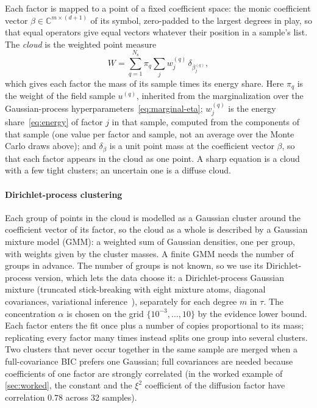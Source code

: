 \documentclass[11pt]{article}
\theoremstyle{plain}
\theoremstyle{definition}
\theoremstyle{remark}
\newcommand{\C}{\mathbb{C}}
\newcommand{\Nsamp}{N_{\mathrm s}}          %
\newcommand{\cloud}{W}                      %
\begin{document}
Each factor is mapped to a point of a fixed coefficient space: the monic coefficient vector
$\beta\in\C^{m\times(d+1)}$ of its symbol, zero-padded to the largest degrees in play, so that equal
operators give equal vectors whatever their position in a sample's list. The \emph{cloud} is the weighted
point measure
\begin{equation}\label{eq:cloud}
  \cloud=\sum_{q=1}^{\Nsamp}\pi_q\sum_jw_j^{(q)}\,\delta_{\beta_j^{(q)}},
\end{equation}
which gives each factor the mass of its sample times its energy share. Here $\pi_q$ is the weight of the field
sample $u^{(q)}$, inherited from the marginalization over the Gaussian-process hyperparameters~\eqref{eq:marginal-eta};
$w_j^{(q)}$ is the energy share~\eqref{eq:energy} of factor $j$ in that sample, computed from the components of that
sample (one value per factor and sample, not an average over the Monte Carlo draws above); and $\delta_{\beta}$ is a unit
point mass at the coefficient vector $\beta$, so that each factor appears in the cloud as one point. A sharp equation is a cloud with
a few tight clusters; an uncertain one is a diffuse cloud.

\paragraph{Dirichlet-process clustering}
Each group of points in the cloud is modelled as a Gaussian cluster around the coefficient vector of its factor, so
the cloud as a whole is described by a Gaussian mixture model (GMM): a weighted sum of Gaussian densities, one per
group, with weights given by the cluster masses. A finite GMM needs the number of groups in advance. The number of
groups is not known, so we use its Dirichlet-process version, which lets the data choose it: a Dirichlet-process Gaussian mixture
(truncated stick-breaking with eight mixture atoms, diagonal covariances, variational
inference~\cite{BleJor06}), separately for each degree $m$ in $\tau$. The concentration $\alpha$ is chosen
on the grid $\{10^{-3},\dots,10\}$ by the evidence lower bound. Each factor enters the fit once plus a
number of copies proportional to its mass; replicating every factor many times instead splits one group
into several clusters. Two clusters that never occur together in the same sample are merged when a
full-covariance BIC prefers one Gaussian; full covariances are needed because coefficients of one factor
are strongly correlated (in the worked example of \cref{sec:worked}, the constant and the $\xi^2$ coefficient of the diffusion factor
have correlation $0.78$ across 32 samples).
\end{document}
